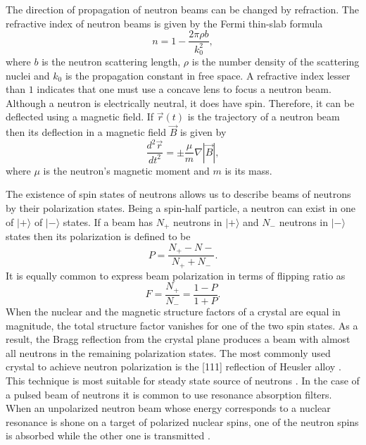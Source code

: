 \documentclass{article}
\numberwithin{equation}{section}
\begin{document}
The direction of propagation of neutron beams can be changed by refraction.
The refractive index of neutron beams is given by the Fermi thin-slab formula
\cite{warner1985neutron}
\begin{equation}\label{s7e3}
n = 1 - \frac{2\pi\rho b}{k_0^2},
\end{equation}
where $b$ is the neutron scattering length, $\rho$ is the number density of
the scattering nuclei and $k_0$ is the propagation constant in free space.
A refractive index lesser than $1$ indicates that one must use a concave lens
to focus a neutron beam. Although a neutron is electrically neutral, it does
have spin. Therefore, it can be deflected using a magnetic field. If 
$\vec{r}(t)$ is the trajectory of a neutron beam then its deflection in a
magnetic field $\vec{B}$ is given by
\begin{equation}\label{s7e4}
\frac{d^2\vec{r}}{dt^2} = \pm\frac{\mu}{m}\nabla|\vec{B}|,
\end{equation}
where $\mu$ is the neutron's magnetic moment and $m$ is its mass.

The existence of spin states of neutrons allows us to describe beams of 
neutrons by their polarization states. Being a spin-half particle, a neutron
can exist in one of $|+\rangle$ of $|-\rangle$ states. If a beam has $N_+$
neutrons in $|+\rangle$ and $N_-$ neutrons in $|-\rangle$ states then its
polarization is defined to be
\begin{equation}\label{s7e5}
P = \frac{N_+ - N-}{N_+ + N_-}.
\end{equation}
It is equally common to express beam polarization in terms of flipping ratio
as
\begin{equation}\label{s7e6}
F = \frac{N_+}{N_-} = \frac{1 - P}{1 + P}.
\end{equation}
When the nuclear and the magnetic structure factors of a crystal are equal in
magnitude, the total structure factor vanishes for one of the two spin states.
As a result, the Bragg reflection from the crystal plane produces a beam with
almost all neutrons in the remaining polarization states. The most commonly
used crystal to achieve neutron polarization is the [111] reflection of 
Heusler alloy \cite{anderson2008neutron}. This technique is most suitable for
steady state source of neutrons \cite{williams1988polarized}. In the case of
a pulsed beam of neutrons it is common to use resonance absorption filters.
When an unpolarized neutron beam whose energy corresponds to a nuclear
resonance is shone on a target of polarized nuclear spins, one of the 
neutron spins is absorbed while the other one is transmitted 
\cite{williams1988polarized}.
\end{document}
